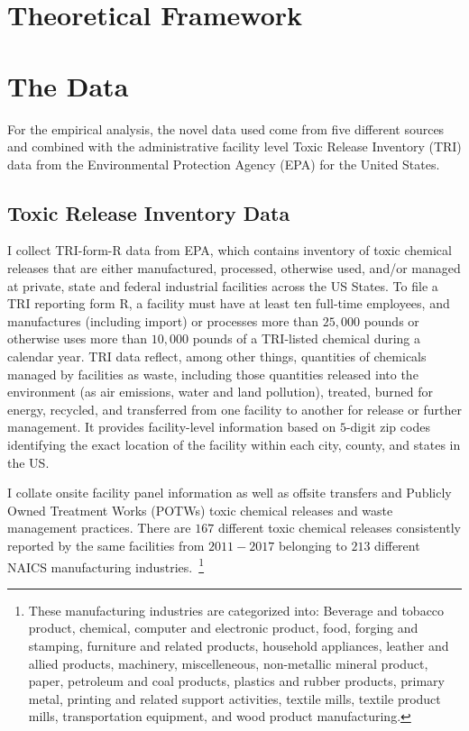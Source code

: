 \documentclass{C:/Users/david/OneDrive/Documents/ULMS/PhD/Thesis/chapter3/src/climate_change/latex/Economic_Journal/OUP-EJ}
\begin{document}
    \section{Theoretical Framework}\label{sec:theoretical-framework}


    \section{The Data}\label{sec:data}
    For the empirical analysis, the novel data used come from five different sources and combined with the administrative facility level Toxic Release Inventory (TRI) data from the Environmental Protection Agency (EPA) for the United States.

    \subsection{Toxic Release Inventory Data}\label{subsec:toxic-release-inventory-data}
    I collect TRI-form-R data from EPA, which contains inventory of toxic chemical releases that are either manufactured, processed, otherwise used, and/or managed at private, state and federal industrial facilities across the US States. To file a TRI reporting form R, a facility must have at least ten full-time employees, and manufactures (including import) or processes more than $25,000$ pounds or otherwise uses more than $10,000$ pounds of a TRI-listed chemical during a calendar year. TRI data reflect, among other things, quantities of chemicals managed by facilities as waste, including those quantities released into the environment (as air emissions, water and land pollution), treated, burned for energy, recycled, and transferred from one facility to another for release or further management. It provides facility-level information based on $5$-digit zip codes identifying the exact location of the facility within each city, county, and states in the US.

    I collate onsite facility panel information as well as offsite transfers and Publicly Owned Treatment Works (POTWs) toxic chemical releases and waste management practices. There are $167$ different toxic chemical releases consistently reported by the same facilities from $2011-2017$ belonging to $213$ different NAICS manufacturing industries.~\footnote{\tiny These manufacturing industries are categorized into: Beverage and tobacco product, chemical, computer and electronic product, food, forging and stamping, furniture and related products, household appliances, leather and allied products, machinery, miscelleneous, non-metallic mineral product, paper, petroleum and coal products, plastics and rubber products, primary metal, printing and related support activities, textile mills, textile product mills, transportation equipment, and wood product manufacturing.}
\end{document}
